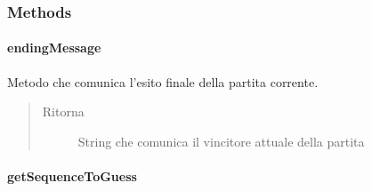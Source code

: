 \documentclass[letterpaper,10pt,italian,openany,oneside]{sphinxmanual}
\begin{document}
\subsubsection{Methods}
\label{\detokenize{source/it/unicam/cs/pa/mastermind/gamecore/SingleMatch:methods}}

\paragraph{endingMessage}
\label{\detokenize{source/it/unicam/cs/pa/mastermind/gamecore/SingleMatch:endingmessage}}

\begin{fulllineitems}
\label{\detokenize{source/it/unicam/cs/pa/mastermind/gamecore/SingleMatch:it.unicam.cs.pa.mastermind.gamecore.SingleMatch.endingMessage()}}
Metodo che comunica l’esito finale della partita corrente.
\begin{quote}\begin{description}
\item[{Ritorna}] \leavevmode
String che comunica il vincitore attuale della partita

\end{description}\end{quote}

\end{fulllineitems}



\paragraph{getSequenceToGuess}
\label{\detokenize{source/it/unicam/cs/pa/mastermind/gamecore/SingleMatch:getsequencetoguess}}

\begin{fulllineitems}
\label{\detokenize{source/it/unicam/cs/pa/mastermind/gamecore/SingleMatch:it.unicam.cs.pa.mastermind.gamecore.SingleMatch.getSequenceToGuess()}}
\end{fulllineitems}
\end{document}
